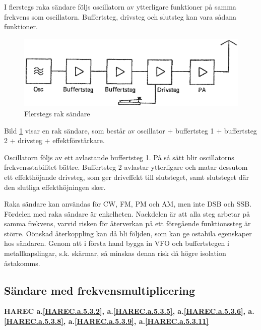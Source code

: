 I flerstegs raka sändare följs oscillatorn av ytterligare funktioner
på samma frekvens som oscillatorn.
Buffertsteg, drivsteg och slutsteg kan vara sådana funktioner.

\begin{figure}
  \includegraphics[width=\textwidth]{images/cropped_pdfs/bild_2_5-02.pdf}
  \caption{Flerstegs rak sändare}
  \label{fig:bildII5-2}
\end{figure}

Bild \ref{fig:bildII5-2} visar en rak sändare, som består av oscillator +
buffertsteg 1 + buffertsteg 2 + drivsteg + effektförstärkare.

Oscillatorn följs av ett avlastande buffertsteg 1.
På så sätt blir oscillatorns frekvensstabilitet bättre.
Buffertsteg 2 avlastar ytterligare och matar dessutom ett effekthöjande
drivsteg, som ger driveffekt till slutsteget, samt slutsteget där den slutliga
effekthöjningen sker.

Raka sändare kan användas för CW, FM, PM och AM, men inte DSB och SSB.
Fördelen med raka sändare är enkelheten.
Nackdelen är att alla steg arbetar på samma frekvens, varvid risken för
återverkan på ett föregående funktionssteg är större.
Oönskad återkoppling kan då bli följden, som kan ge ostabila egenskaper hos
sändaren.
Genom att i första hand bygga in VFO och buffertstegen i metallkapslingar,
s.k. skärmar, så minskas denna risk då högre isolation åstakomms.

\subsection{Sändare med frekvensmultiplicering}
\textbf{HAREC
 a.\ref{HAREC.a.5.3.2}\label{myHAREC.a.5.3.2},
 a.\ref{HAREC.a.5.3.5}\label{myHAREC.a.5.3.5},
 a.\ref{HAREC.a.5.3.6}\label{myHAREC.a.5.3.6},
 a.\ref{HAREC.a.5.3.8}\label{myHAREC.a.5.3.8},
 a.\ref{HAREC.a.5.3.9}\label{myHAREC.a.5.3.9},
 a.\ref{HAREC.a.5.3.11}\label{myHAREC.a.5.3.11}
}

